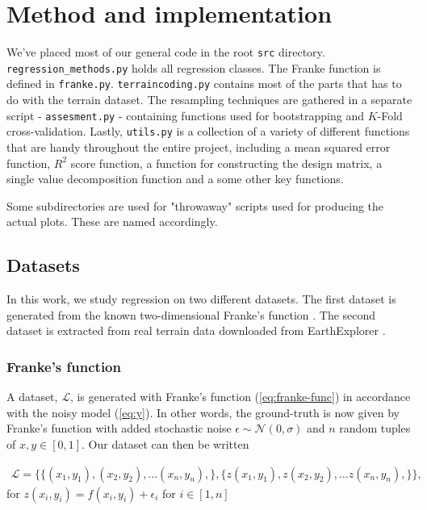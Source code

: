 \documentclass[../main.tex]{subfiles}
\begin{document}
\section{Method and implementation}\label{sec:method}
We've placed most of our general code in the root \verb|src| directory. \verb|regression_methods.py| holds all regression classes. The Franke function is defined in \verb|franke.py|. \verb|terraincoding.py| contains most of the parts that has to do with the terrain dataset. The resampling techniques are gathered in a separate script - \verb|assesment.py| - containing functions used for bootstrapping and $K$-Fold cross-validation. Lastly, \verb|utils.py| is a collection of a variety of different functions that are handy throughout the entire project, including a mean squared error function, $R^2$ score function, a function for constructing the design matrix, a single value decomposition function and a some other key functions.

Some subdirectories are used for "throwaway" scripts used for producing the actual plots. These are named accordingly.

\subsection{Datasets}
In this work, we study regression on two different datasets. The first dataset is generated from the known two-dimensional Franke's function \cite{FrankeRichard1979}. The second dataset is extracted from real terrain data downloaded from EarthExplorer \cite{EarthExplorer}. 

\subsubsection{Franke's function}
A dataset, \ensuremath{\mathcal{L}}, is generated with Franke's function (\cref{eq:franke-func}) in accordance with the noisy model (\cref{eq:y}). In other words, the ground-truth is now given by Franke's function with added stochastic noise \ensuremath{\epsilon\sim\mathcal{N}(0,\sigma)} and $n$ random tuples of \ensuremath{x,y \in [0,1]}. Our dataset can then be written

\begin{align*}
    \mathcal{L}=\{\{(x_1,y_1), (x_2,y_2), \ldots (x_n,y_n),\},\{z(x_1,y_1),z(x_2,y_2), \ldots z(x_n,y_n),\}\},
\end{align*} for \ensuremath{z(x_i,y_i)=f(x_i,y_i)+\epsilon_i} for \ensuremath{i \in [1, n]}
\end{document}
